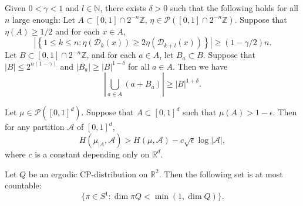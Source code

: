 \documentclass[10pt,a4paper]{amsart}
\def\D{\mathcal{D}}
\def\N{\mathbb N}
\def\R{\mathbb R}
\def\Z{\mathbb Z}
\def\cP{\mathcal P}
\begin{document}
\begin{theorem}\label{thm:entropy-increase-1}
Given $0<\gamma<1$ and $l\in \N$, there exists $\delta>0$ such that the following holds for all $n$ large enough: Let $A\subset [0,1]\cap 2^{-n}\Z$,  $\eta\in \cP([0,1]\cap 2^{-n}\Z)$.  Suppose that $\eta(A)\ge 1/2$ and for each $x\in A$,
\begin{equation}\label{eq:thm:ent-incre:1}
\left| \left\{1\le k\le n: \eta(\D_k(x))\ge 2\eta(\D_{k+l}(x))\right\} \right| \ge (1-\gamma/2)n.
\end{equation}
Let $B\subset [0,1]\cap 2^{-n}\Z$,  and for each $a\in A$,  let $B_a\subset B$.   Suppose that $|B|\le 2^{n(1-\gamma)}$ and $|B_a|\ge |B|^{1-\delta}$ for all $a\in A$. Then we have
\[
\left| \bigcup_{a\in A}(a+B_a) \right| \ge |B|^{1+\delta}.
\]
\end{theorem}

\begin{lemma}\label{lemma:entropy of restricted meas-small delete}
Let $\mu\in \cP([0,1]^d)$. Suppose that $A\subset [0,1]^d$ such that $\mu(A)>1-\epsilon$. Then for any partition $\mathcal{A}$ of $[0,1]^d$,
\[
H(\mu_{|A},\mathcal{A}) >  H(\mu,\mathcal{A})-c\sqrt{\epsilon}\log |\mathcal{A}|,
\]
where $c$ is a constant depending only on $\R^d$.
\end{lemma}

\begin{theorem}\label{thm:proj-cp-distribution:1}
Let $Q$ be an ergodic CP-distribution on $\R^2$. Then the following set is at most countable:
\begin{equation}\label{eq:thm:proj-cp-distribution:1}
\{ \pi\in S^1: \dim\pi Q < \min(1,\dim Q)\}.
\end{equation}
\end{theorem}
\end{document}
